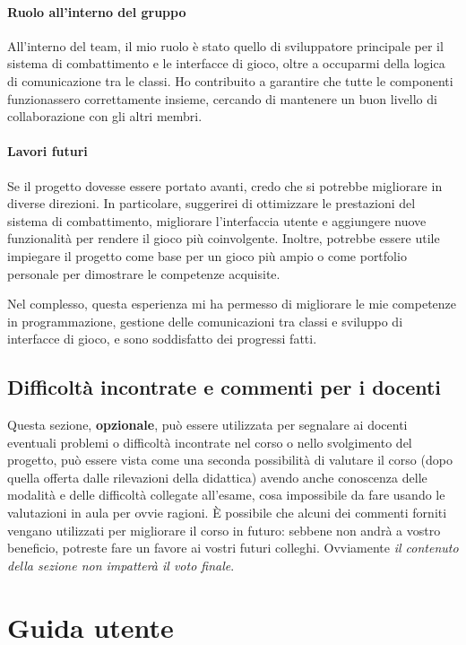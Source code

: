 \documentclass[a4paper,12pt]{report}
\begin{document}
\subsubsection{Ruolo all'interno del gruppo}
All'interno del team, il mio ruolo è stato quello di sviluppatore principale per il sistema di combattimento e le interfacce di gioco, oltre a occuparmi della logica di comunicazione tra le classi. Ho contribuito a garantire che tutte le componenti funzionassero correttamente insieme, cercando di mantenere un buon livello di collaborazione con gli altri membri.

\subsubsection{Lavori futuri}
Se il progetto dovesse essere portato avanti, credo che si potrebbe migliorare in diverse direzioni. In particolare, suggerirei di ottimizzare le prestazioni del sistema di combattimento, migliorare l'interfaccia utente e aggiungere nuove funzionalità per rendere il gioco più coinvolgente. Inoltre, potrebbe essere utile impiegare il progetto come base per un gioco più ampio o come portfolio personale per dimostrare le competenze acquisite.

Nel complesso, questa esperienza mi ha permesso di migliorare le mie competenze in programmazione, gestione delle comunicazioni tra classi e sviluppo di interfacce di gioco, e sono soddisfatto dei progressi fatti.
\section{Difficoltà incontrate e commenti per i docenti}

Questa sezione, \textbf{opzionale}, può essere utilizzata per segnalare ai docenti eventuali problemi o difficoltà incontrate nel corso o nello svolgimento del progetto, può essere vista come una seconda possibilità di valutare il corso (dopo quella offerta dalle rilevazioni della didattica) avendo anche conoscenza delle modalità e delle difficoltà collegate all'esame, cosa impossibile da fare usando le valutazioni in aula per ovvie ragioni.
%
È possibile che alcuni dei commenti forniti vengano utilizzati per migliorare il corso in futuro: sebbene non andrà a vostro beneficio, potreste fare un favore ai vostri futuri colleghi.
%
Ovviamente \textit{il contenuto della sezione non impatterà il voto finale}.

\appendix
\chapter{Guida utente}
\end{document}
